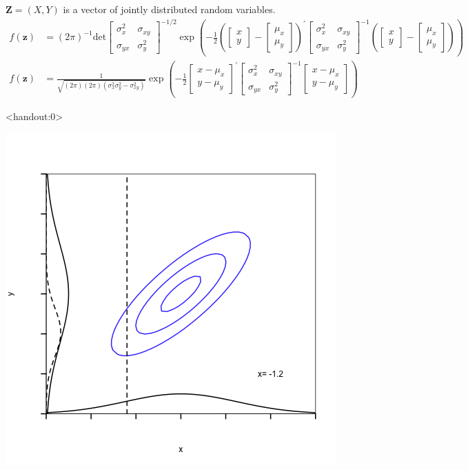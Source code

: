 \documentclass[aspectratio=169, handout]{beamer}
\numberwithin{equation}{section}
\begin{document}
\begin{frame}
$\boldsymbol{Z} = (X, Y) $ is a vector of jointly distributed random variables.
\begin{align*}
f(\boldsymbol{z}) & = (2 \pi)^{-1} \text{det}\begin{bmatrix}\sigma_x^2&\sigma_{xy}\\ \sigma_{yx}&\sigma_y^2\end{bmatrix}^{-1/2} \exp\left(-\frac{1}{2}(\begin{bmatrix}x\\y \end{bmatrix} - \begin{bmatrix}\mu_x\\\mu_y \end{bmatrix})^{'}\begin{bmatrix}\sigma_x^2&\sigma_{xy}\\ \sigma_{yx}&\sigma_y^2\end{bmatrix}^{-1}(\begin{bmatrix}x\\y \end{bmatrix} - \begin{bmatrix}\mu_x\\\mu_y \end{bmatrix} ) \right) \\
f(\boldsymbol{z}) & = \frac{1}{\sqrt{(2 \pi) (2 \pi)(\sigma_x^2\sigma_y^2-\sigma_{xy}^2)}} \exp\left(-\frac{1}{2}\begin{bmatrix}x-\mu_x\\y-\mu_y \end{bmatrix}^{'}\begin{bmatrix}\sigma_x^2&\sigma_{xy}\\ \sigma_{yx}&\sigma_y^2\end{bmatrix}^{-1}\begin{bmatrix}x-\mu_x\\y-\mu_y \end{bmatrix} \right) 
\end{align*}
\end{frame}


\begin{frame}<handout:0>
\begin{center}
\includegraphics[width=3 in]{Images/CEF/BVN-1_2.png}
\end{center}
\end{frame}
\end{document}
